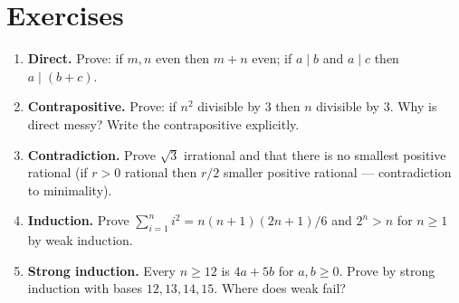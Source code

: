 \section{Exercises}
\label{sec:ch04-exercises}
\begin{enumerate}[label=E4.\arabic*, leftmargin=*, itemsep=0.6em]
\item \textbf{Direct.} Prove: if $m,n$ even then $m+n$ even; if $a\mid b$ and $a\mid c$ then $a\mid(b+c)$.
\item \textbf{Contrapositive.} Prove: if $n^2$ divisible by $3$ then $n$ divisible by $3$. Why is direct messy? Write the contrapositive explicitly.
\item \textbf{Contradiction.} Prove $\sqrt3$ irrational and that there is no smallest positive rational (if $r>0$ rational then $r/2$ smaller positive rational --- contradiction to minimality).
\item \textbf{Induction.} Prove $\sum_{i=1}^{n}i^2=n(n+1)(2n+1)/6$ and $2^n>n$ for $n\ge1$ by weak induction.
\item \textbf{Strong induction.} Every $n\ge12$ is $4a+5b$ for $a,b\ge0$. Prove by strong induction with bases $12,13,14,15$. Where does weak fail?
\end{enumerate}
